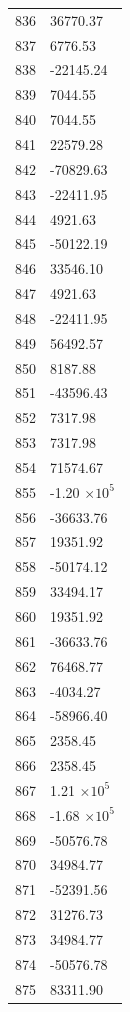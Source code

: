 \documentclass[a4paper,11pt]{article}
\begin{document}
\begin{center}
\begin{longtable}{|R{1.5cm}|R{2.6cm}|}
  836 &     36770.37 \\
  837 &      6776.53 \\
  838 &    -22145.24 \\
  839 &      7044.55 \\
  840 &      7044.55 \\
  841 &     22579.28 \\
  842 &    -70829.63 \\
  843 &    -22411.95 \\
  844 &      4921.63 \\
  845 &    -50122.19 \\
  846 &     33546.10 \\
  847 &      4921.63 \\
  848 &    -22411.95 \\
  849 &     56492.57 \\
  850 &      8187.88 \\
  851 &    -43596.43 \\
  852 &      7317.98 \\
  853 &      7317.98 \\
  854 &     71574.67 \\
  855 &        -1.20 $\times 10^{           5}$ \\
  856 &    -36633.76 \\
  857 &     19351.92 \\
  858 &    -50174.12 \\
  859 &     33494.17 \\
  860 &     19351.92 \\
  861 &    -36633.76 \\
  862 &     76468.77 \\
  863 &     -4034.27 \\
  864 &    -58966.40 \\
  865 &      2358.45 \\
  866 &      2358.45 \\
  867 &         1.21 $\times 10^{           5}$ \\
  868 &        -1.68 $\times 10^{           5}$ \\
  869 &    -50576.78 \\
  870 &     34984.77 \\
  871 &    -52391.56 \\
  872 &     31276.73 \\
  873 &     34984.77 \\
  874 &    -50576.78 \\
  875 &     83311.90 \\

\end{longtable}
\end{center}
\end{document}
